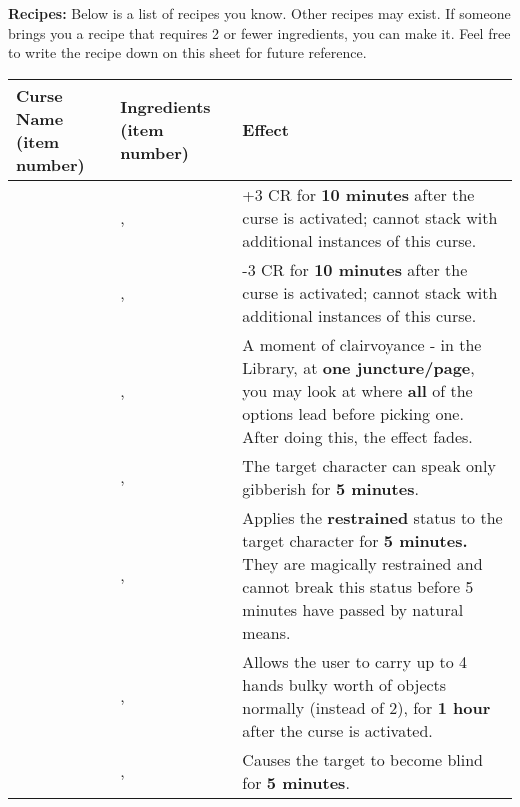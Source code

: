 \documentclass[green]{GL2020}
\begin{document}
\textbf{Recipes:}
Below is a list of recipes you know. Other recipes may exist. If someone brings you a recipe that requires 2 or fewer ingredients, you can make it. Feel free to write the recipe down on this sheet for future reference.

\begin{tabularx}{\textwidth}{| >{\centering\arraybackslash} m{4cm} | >{\centering\arraybackslash} m{4cm} | X |}
\hline
	\textbf{Curse Name (item number)} & \textbf{Ingredients (item number)}  & \textbf{Effect} \\
\hline
\hline
	\iCourage{}	&	\iMoonflower{}, \iLimestone{}   & +3 CR  for \textbf{10 minutes} after the curse is activated; cannot stack with additional instances of this curse.	\\
\hline
	\iWeakness{}	& \iNightshade{}, \iBlackCrocus{}   &	-3 CR  for \textbf{10 minutes} after the curse is activated; cannot stack with additional instances of this curse. \\
\hline	
	\iInsight{}	& \iMorningGlory{}, \iEagleFeather{}	& A moment of clairvoyance - in the Library, at \textbf{one juncture/page}, you may look at where \textbf{all} of the options lead before picking one. After doing this, the effect fades. \\
\hline	
	\iBabble{}	& \iClay{}, \iSpiderWeb{}	&	The target character can speak only gibberish for \textbf{5 minutes}. \\
\hline	
	\iRestraint{}	& \iSpiderWeb{}, \iLily{}	&	Applies the \textbf{restrained} status to the target character for \textbf{5 minutes.} They are magically restrained and cannot break this status before 5 minutes have passed by natural means.\\
\hline	
	\iStrength{}	&	\iFlameOrchid{}, \iObsidian{} &	Allows the user to carry up to 4 hands bulky worth of objects normally (instead of 2), for \textbf{1 hour} after the curse is activated. \\
\hline	
	\iBlindness{}	&	\iMorningGlory{}, \iClay{} & Causes the target to become blind for \textbf{5 minutes}.\\
\hline	

\end{tabularx}
\end{document}
